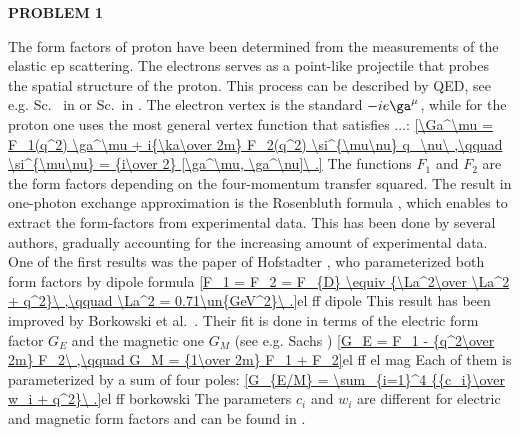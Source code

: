 \iffalse
Before discussing the problems in a greater detail, let us make a comment about the Coulomb-hadronic interference phase. Many authors (including Bethe \bref{bethe58} and \WY{} \bref{wy68}) decomposed the full amplitude in the following way
\eqref{F^{C+H}(t) = F^C(t) e^{i \al \Ph(t)} + F^H(t)\ .}{el FCH decomp}
Since the phase $\Ph$ is real in their treatments, the phase factor can be moved to the hadronic amplitude $F^H$:
\eqref{F^{C+H}(t) e^{-i \al \Ph(t)} = F^C(t) + F^H(t) e^{-i \al \Ph(t)}\ .}{el FCH decomp2}
The phase shift of the full amplitude is not observable. This form is more similar to the formulae of Cahn \bref{cahn82} and \KL{} \bref{kl94}, which can be written as
\eqref{F^{C+H}(t) = F^C(t) + F^H(t) e^{i \al \Ps(t)}\ .}{el FCH decomp2}
Here we took the liberty to exponentiate the factor $1+ia\Ps$. This modification introduces corrections of the order $\O{\al^2}$, that is the order which is commonly neglected in the work of Cahn \bref{cahn82}. The ``phase'' $\Ps$ may generally be complex (and thus it does not qualify to be called phase) and that is why it cannot be moved to the Coulomb amplitude. Still, it will be interesting to compare the phases:
\eqref{-\Ph\quad\hbox{vs.}\quad\Ps\ .}{}
\fi

{\bf PROBLEM 1}

The form factors of proton have been determined from the measurements of the elastic ep scattering. The electrons serves as a point-like projectile that probes the spatial structure of the proton. This process can be described by QED, see e.g. Sc. ~in  or Sc.~in . The electron vertex is the standard $-ie\ga^\mu$, while for the proton one uses the most general vertex function that satisfies ...:
\eqref{\Ga^\mu = F_1(q^2) \ga^\mu + i{\ka\over 2m} F_2(q^2) \si^{\mu\nu} q_\nu\ ,\qquad \si^{\mu\nu} = {i\over 2} [\ga^\mu, \ga^\nu]\ .}{}
The functions $F_1$ and $F_2$ are the form factors depending on the four-momentum transfer squared. The result in one-photon exchange approximation is the Rosenbluth formula , which enables to extract the form-factors from experimental data. This has been done by several authors, gradually accounting for the increasing amount of experimental data. One of the first results was the paper of Hofstadter , who parameterized both form factors by dipole formula
\eqref{F_1 = F_2 = F_{D} \equiv {\La^2\over \La^2 + q^2}\ ,\qquad \La^2 = 0.71\un{GeV^2}\ .}{el ff dipole}
This result has been improved by Borkowski et al.~. Their fit is done in terms of the electric form factor $G_E$ and the magnetic one $G_M$ (see e.g. Sachs )
\eqref{G_E = F_1 - {q^2\over 2m} F_2\ ,\qquad G_M = {1\over 2m} F_1 + F_2}{el ff el mag}
Each of them is parameterized by a sum of four poles:
\eqref{G_{E/M} = \sum_{i=1}^4 {{c_i}\over w_i + q^2}\ .}{el ff borkowski}
The parameters $c_i$ and $w_i$ are different for electric and magnetic form factors and can be found in .

